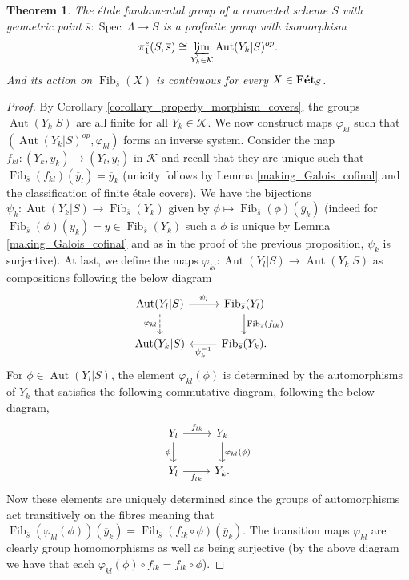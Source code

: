 \documentclass{article}
\theoremstyle{plain}
\newtheorem{theorem}{Theorem}[subsection]
\theoremstyle{definition}
\DeclareMathOperator{\Fib}{Fib}
\DeclareMathOperator{\Aut}{Aut}
\DeclareMathOperator{\Spec}{Spec}
\DeclareMathOperator{\Fet}{\bf{F\acute{e}t}}
\begin{document}
\begin{theorem}
    The \'etale fundamental group of a connected scheme $S$ with geometric point $\overline{s}:\Spec\:\Lambda\rightarrow S$ is a profinite group with isomorphism 
    $$\pi_1^e(S,\overline{s}) \cong \varprojlim_{Y_k\in\mathcal{K}} \Aut(Y_k|S)^{op}.$$
    And its action on $\Fib_{\overline{s}}(X)$ is continuous for every $X\in\Fet_S$.
\end{theorem}
\begin{proof}
    By Corollary \ref{corollary_property_morphism_covers}, the groups $\Aut(Y_k|S)$ are all finite for all $Y_k\in \mathcal{K}$.
    We now construct maps $\varphi_{kl}$ such that $(\Aut(Y_k|S)^{op}, \varphi_{kl})$ forms an inverse system.
    Consider the map $f_{kl}: (Y_k,\overline{y}_k)\rightarrow(Y_l,\overline{y}_l)$ in $\mathcal{K}$ and recall that they are unique such that $\Fib_{\overline{s}}(f_{kl})(\overline{y}_l) = \overline{y}_k$ (unicity follows by Lemma \ref{making_Galois_cofinal} and the classification of finite \'etale covers).
    We have the bijections $\psi_k : \Aut(Y_k|S) \rightarrow \Fib_{\overline{s}}(Y_k)$ given by $\phi\mapsto \Fib_{\overline{s}}(\phi)(\overline{y}_k)$ 
    (indeed for $\Fib_{\overline{s}}(\phi)(\overline{y}_k) = \overline{y} \in \Fib_{\overline{s}}(Y_k)$ such a $\phi$ is unique by Lemma \ref{making_Galois_cofinal} and as in the proof of the previous proposition, $\psi_k$ is surjective).
    At last, we define the maps $\varphi_{kl} : \Aut(Y_l|S)\rightarrow\Aut(Y_k|S)$ as compositions following the below diagram
    \[
    \begin{tikzcd}
        \Aut(Y_l|S) \arrow[r,"\psi_l"] \arrow[d, dashed, "\varphi_{kl}"'] & \Fib_{\overline{s}}(Y_l) \arrow[d,"\Fib_{\overline{s}}(f_{lk})"] \\
        \Aut(Y_k|S) &  \Fib_{\overline{s}}(Y_k) \arrow[l, "\psi_k^{-1}"].
    \end{tikzcd}
    \]
    For $\phi\in\Aut(Y_l|S)$, the element $\varphi_{kl}(\phi)$ is determined by the automorphisms of $Y_k$ that satisfies the following commutative diagram,
    following the below diagram,
    \[
    \begin{tikzcd}
        Y_l  \arrow[d, "\phi"'] \arrow[r,"f_{lk}"] & Y_k \arrow[d,"\varphi_{kl}(\phi)"] \\
        Y_l \arrow[r,"f_{lk}"'] &  Y_k.
    \end{tikzcd}
    \]
    Now these elements are uniquely determined since the groups of automorphisms act transitively on the fibres meaning that  $\Fib_{\overline{s}}(\varphi_{kl}(\phi))(\overline{y}_k) = \Fib_{\overline{s}}(f_{lk}\circ\phi)(\overline{y}_k)$. The transition maps $\varphi_{kl}$ are clearly group homomorphisms as well as being surjective (by the above diagram we have that each $\varphi_{kl}(\phi)\circ f_{lk} = f_{lk}\circ \phi$).

\end{proof}
\end{document}
